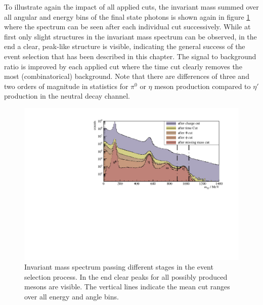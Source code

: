 To illustrate again the impact of all applied cuts, the invariant mass summed over all angular and energy bins of the final state photons is shown again in figure \ref{fig:invm_pretty} where the spectrum can be seen after each individual cut successively. While at first only slight structures in the invariant mass spectrum can be observed, in the end a clear, peak-like structure is visible, indicating the general success of the event selection that has been described in this chapter. The signal to background ratio is improved by each applied cut where the time cut clearly removes the most (combinatorical) background. Note that there are differences of three and two orders of magnitude in statistics for $\pi^0$ or $\eta$ meson production compared to $\eta'$ production in the neutral decay channel. 
\begin{figure}[t]
	\centering
	\includegraphics[width=\linewidth]{../figs/hydrogen/inv_mass_pretty.pdf}
	\caption{Invariant mass spectrum passing different stages in the event selection process. In the end clear peaks for all possibly produced mesons are visible. The vertical lines indicate the mean cut ranges over all energy and angle bins.}
	\label{fig:invm_pretty}
\end{figure}
